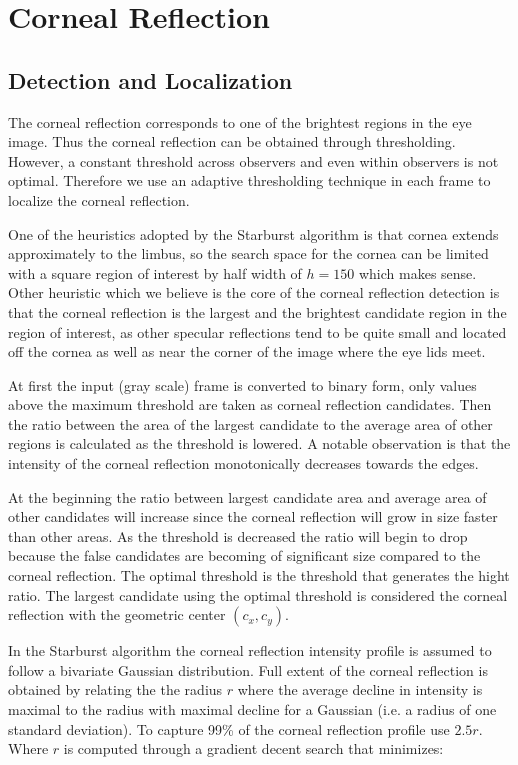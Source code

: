 \section{Corneal Reflection}
\subsection{Detection and Localization}

The corneal reflection corresponds to one of the brightest regions in the eye image. Thus the corneal reflection can be obtained through thresholding. However, a constant threshold across observers and even within observers is not optimal. Therefore we use an adaptive thresholding technique in each frame to localize the corneal reflection. \bigskip

One of the heuristics adopted by the Starburst algorithm is that cornea extends approximately to the limbus, so the search space for the cornea can be limited with a square region of interest by half width of $h = 150$ which makes sense. Other heuristic which we believe is the core of the corneal reflection detection is that the corneal reflection is the largest and the brightest candidate region in the region of interest, as other specular reflections tend to be quite small and located off the cornea as well as near the corner of the image where the eye lids meet. \bigskip

At first the input (gray scale) frame is converted to binary form, only values above the maximum threshold are taken as corneal reflection candidates. Then the ratio between the area of the largest candidate to the average area of other regions is calculated as the threshold is lowered. A notable observation is that the intensity of the corneal reflection monotonically decreases towards the edges.\bigskip

At the beginning the ratio between  largest candidate area and average area of other candidates will increase since the corneal reflection will grow in size faster than other areas. As the threshold is decreased the ratio will begin to drop because the false candidates are becoming of significant size compared to the corneal reflection. The optimal threshold is the threshold that generates the hight ratio. The largest candidate using the optimal threshold is considered the corneal reflection with the geometric center $(c_{x}, c_{y})$. \bigskip

In the Starburst algorithm the corneal reflection intensity profile is assumed to follow a bivariate Gaussian distribution. Full extent of the corneal reflection is obtained by relating the the radius $r$ where the average decline in intensity is maximal to the radius with maximal decline for a Gaussian (i.e. a radius of one standard deviation). To capture 99\% of the corneal reflection profile use $2.5r$. Where $r$ is computed through a gradient decent search that minimizes:


